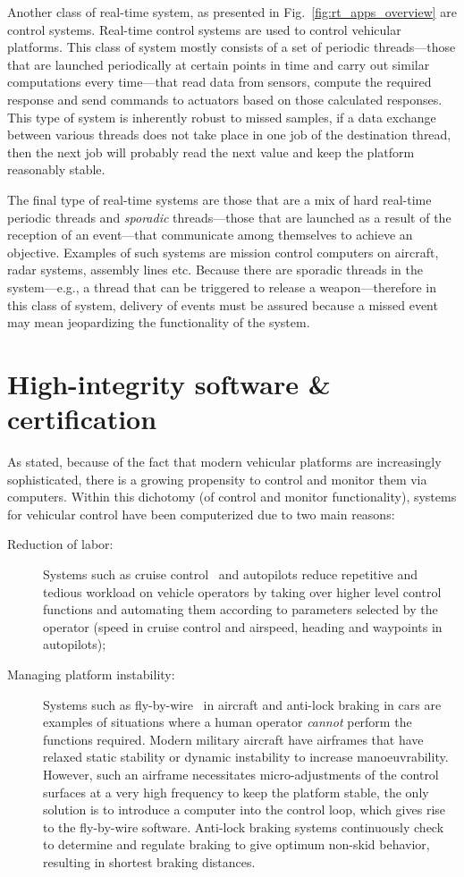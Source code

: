 Another class of real-time system, as presented in
Fig.~\ref{fig:rt_apps_overview} are control systems. Real-time control
systems are used to control vehicular platforms. This class of system
mostly consists of a set of periodic threads---those that are launched
periodically at certain points in time and carry out similar
computations every time---that read data from sensors, compute the
required response and send commands to actuators based on those
calculated responses. This type of system is inherently robust to
missed samples, if a data exchange between various threads does not
take place in one job of the destination thread, then the next job
will probably read the next value and keep the platform reasonably
stable.

The final type of real-time systems are those that are a mix of hard
real-time periodic threads and \emph{sporadic} threads---those that
are launched as a result of the reception of an event---that
communicate among themselves to achieve an objective. Examples of such
systems are mission control computers on aircraft, radar systems,
assembly lines etc. Because there are sporadic threads in the
system---e.g., a thread that can be triggered to release a
weapon---therefore in this class of system, delivery of events must be
assured because a missed event may mean jeopardizing the functionality
of the system.

\section{High-integrity software \& certification}
As stated, because of the fact that modern vehicular platforms are
increasingly sophisticated, there is a growing propensity to control
and monitor them via computers. Within this dichotomy (of control and
monitor functionality), systems for vehicular control have been
computerized due to two main reasons:

\begin{description}
\item[Reduction of labor:]{Systems such as cruise
  control~\cite{jones@jpam90} and autopilots reduce repetitive and
  tedious workload on vehicle operators by taking over higher level
  control functions and automating them according to parameters
  selected by the operator (speed in cruise control and airspeed,
  heading and waypoints in autopilots);}
\item[Managing platform instability:]{Systems such as
  fly-by-wire~\cite{langer@rtsep92} in aircraft and anti-lock braking
  in cars are examples of situations where a human operator
  \emph{cannot} perform the functions required. Modern military
  aircraft have airframes that have relaxed static stability or
  dynamic instability to increase manoeuvrability.  However, such an
  airframe necessitates micro-adjustments of the control surfaces at a
  very high frequency to keep the platform stable, the only solution
  is to introduce a computer into the control loop, which gives rise
  to the fly-by-wire software. Anti-lock braking systems continuously
  check to determine and regulate braking to give optimum non-skid
  behavior, resulting in shortest braking distances.}
\end{description}

